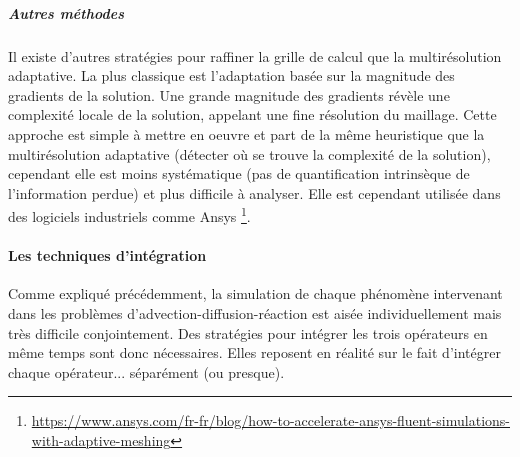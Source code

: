         \subparagraph{Autres méthodes}
        Il existe d'autres stratégies pour raffiner la grille de calcul que la multirésolution adaptative.
        La plus classique est l'adaptation basée sur la magnitude des gradients de la solution. Une grande magnitude des gradients révèle une complexité locale de la solution,
        appelant une fine résolution du maillage. Cette approche est simple à mettre en oeuvre et part de la même heuristique 
        que la multirésolution adaptative (détecter où se trouve la complexité de la solution), cependant elle est moins systématique (pas de quantification intrinsèque de l'information perdue) et plus difficile à analyser. 
        Elle est cependant utilisée dans des logiciels industriels comme Ansys 
        \footnote{\href{https://w.ww.ansys.com/fr-fr/blog/how-to-accelerate-ansys-fluent-simulations-with-adaptive-meshing}{https://www.ansys.com/fr-fr/blog/how-to-accelerate-ansys-fluent-simulations-with-adaptive-meshing}}.

    \paragraph{Les techniques d'intégration}
        Comme expliqué précédemment, la simulation de chaque phénomène intervenant dans les problèmes d'advection-diffusion-réaction est aisée individuellement mais très difficile conjointement.
        Des stratégies pour intégrer les trois opérateurs en même temps sont donc nécessaires. Elles reposent en réalité sur le fait d'intégrer chaque opérateur... séparément (ou presque).

